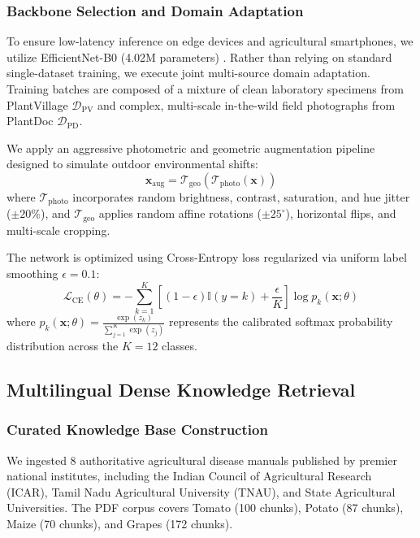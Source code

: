 \documentclass[conference]{IEEEtran}
\begin{document}
\subsubsection{Backbone Selection and Domain Adaptation}
To ensure low-latency inference on edge devices and agricultural smartphones, we utilize EfficientNet-B0 (4.02M parameters) \cite{tan2019efficientnet}. Rather than relying on standard single-dataset training, we execute joint multi-source domain adaptation. Training batches are composed of a mixture of clean laboratory specimens from PlantVillage $\mathcal{D}_{\text{PV}}$ and complex, multi-scale in-the-wild field photographs from PlantDoc $\mathcal{D}_{\text{PD}}$.

We apply an aggressive photometric and geometric augmentation pipeline designed to simulate outdoor environmental shifts:
\begin{equation}
\mathbf{x}_{\text{aug}} = \mathcal{T}_{\text{geo}}(\mathcal{T}_{\text{photo}}(\mathbf{x}))
\end{equation}
where $\mathcal{T}_{\text{photo}}$ incorporates random brightness, contrast, saturation, and hue jitter ($\pm 20\%$), and $\mathcal{T}_{\text{geo}}$ applies random affine rotations ($\pm 25^{\circ}$), horizontal flips, and multi-scale cropping.

The network is optimized using Cross-Entropy loss regularized via uniform label smoothing $\epsilon = 0.1$:
\begin{equation}
\mathcal{L}_{\text{CE}}(\theta) = -\sum_{k=1}^{K} \left[ (1 - \epsilon)\mathbb{I}(y = k) + \frac{\epsilon}{K} \right] \log p_k(\mathbf{x}; \theta)
\label{eq:label_smooth}
\end{equation}
where $p_k(\mathbf{x}; \theta) = \frac{\exp(z_k)}{\sum_{j=1}^K \exp(z_j)}$ represents the calibrated softmax probability distribution across the $K = 12$ classes.

\subsection{Multilingual Dense Knowledge Retrieval}
\subsubsection{Curated Knowledge Base Construction}
We ingested 8 authoritative agricultural disease manuals published by premier national institutes, including the Indian Council of Agricultural Research (ICAR), Tamil Nadu Agricultural University (TNAU), and State Agricultural Universities. The PDF corpus covers Tomato (100 chunks), Potato (87 chunks), Maize (70 chunks), and Grapes (172 chunks).
\end{document}
